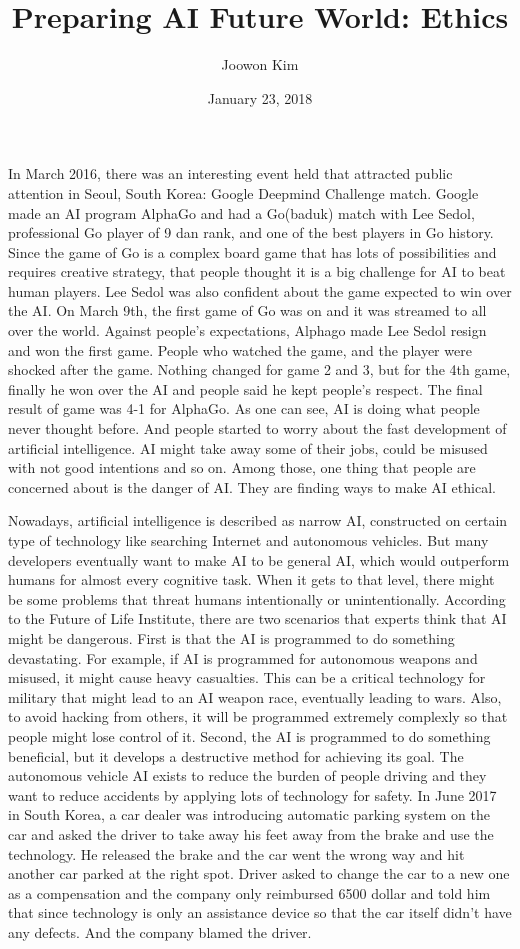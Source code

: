 \documentclass[12pt]{article}
\begin{document}
\title{Preparing AI Future World: Ethics}
\author{Joowon Kim}
\date{January 23, 2018}
\maketitle
	In March 2016, there was an interesting event held that attracted public attention in Seoul, South Korea: Google Deepmind Challenge match. Google made an AI program AlphaGo and had a Go(baduk) match with Lee Sedol, professional Go player of 9 dan rank, and one of the best players in Go history. Since the game of Go is a complex board game that has lots of possibilities and requires creative strategy, that people thought it is a big challenge for AI to beat human players. Lee Sedol was also confident about the game expected to win over the AI. On March 9th, the first game of Go was on and it was streamed to all over the world. Against people's expectations, Alphago made Lee Sedol resign and won the first game. People who watched the game, and the player were shocked after the game. Nothing changed for game 2 and 3, but for the 4th game, finally he won over the AI and people said he kept people's respect. The final result of game was 4-1 for AlphaGo. As one can see, AI is doing what people never thought before. And people started to worry about the fast development of artificial intelligence. AI might take away some of their jobs, could be misused with not good intentions and so on. Among those, one thing that people are concerned about is the danger of AI. They are finding ways to make AI ethical. \par
	Nowadays, artificial intelligence is described as narrow AI, constructed on certain type of technology like searching Internet and autonomous vehicles. But many developers eventually want to make AI to be general AI, which would outperform humans for almost every cognitive task. When it gets to that level, there might be some problems that threat humans intentionally or unintentionally. According to the Future of Life Institute, there are two scenarios that experts think that AI might be dangerous. First is that the AI is programmed to do something devastating. For example, if AI is programmed for autonomous weapons and misused, it might cause heavy casualties. This can be a critical technology for military that might lead to an AI weapon race, eventually leading to wars. Also, to avoid hacking from others, it will be programmed extremely complexly so that people might lose control of it. Second, the AI is programmed to do something beneficial, but it develops a destructive method for achieving its goal. The autonomous vehicle AI exists to reduce the burden of people driving and they want to reduce accidents by applying lots of technology for safety. In June 2017 in South Korea, a car dealer was introducing automatic parking system on the car and asked the driver to take away his feet away from the brake and use the technology. He released the brake and the car went the wrong way and hit another car parked at the right spot. Driver asked to change the car to a new one as a compensation and the company only reimbursed 6500 dollar and told him that since technology is only an assistance device so that the car itself didn't have any defects. And the company blamed the driver. \par
\end{document}
